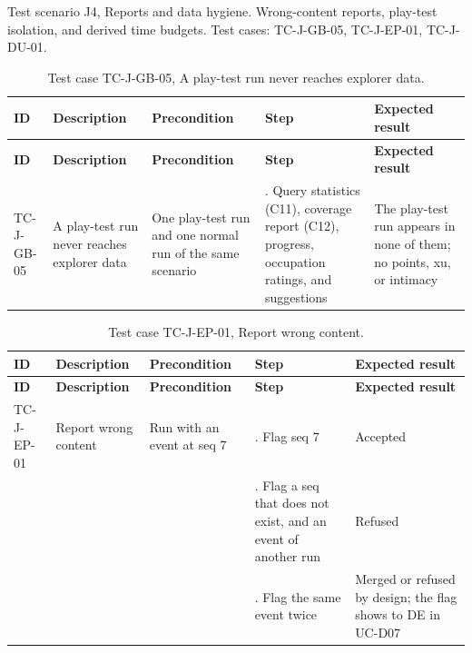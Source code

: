 Test scenario J4, Reports and data hygiene. Wrong-content reports, play-test isolation, and derived time budgets. Test cases: TC-J-GB-05, TC-J-EP-01, TC-J-DU-01.

{\small
\begin{longtable}{|>{\raggedright\arraybackslash}p{}|>{\raggedright\arraybackslash}p{}|>{\raggedright\arraybackslash}p{}|>{\raggedright\arraybackslash}p{}|>{\raggedright\arraybackslash}p{}|}
\caption{Test case TC-J-GB-05, A play-test run never reaches explorer data.} \\
\hline
\textbf{ID} & \textbf{Description} & \textbf{Precondition} & \textbf{Step} & \textbf{Expected result} \\ \hline
\endfirsthead
\hline
\textbf{ID} & \textbf{Description} & \textbf{Precondition} & \textbf{Step} & \textbf{Expected result} \\ \hline
\endhead
TC-J-GB-05 & A play-test run never reaches explorer data & One play-test run and one normal run of the same scenario & 1. Query statistics (C11), coverage report (C12), progress, occupation ratings, and suggestions & The play-test run appears in none of them; no points, xu, or intimacy \\ \hline
\end{longtable}
}

{\small
\begin{longtable}{|>{\raggedright\arraybackslash}p{}|>{\raggedright\arraybackslash}p{}|>{\raggedright\arraybackslash}p{}|>{\raggedright\arraybackslash}p{}|>{\raggedright\arraybackslash}p{}|}
\caption{Test case TC-J-EP-01, Report wrong content.} \\
\hline
\textbf{ID} & \textbf{Description} & \textbf{Precondition} & \textbf{Step} & \textbf{Expected result} \\ \hline
\endfirsthead
\hline
\textbf{ID} & \textbf{Description} & \textbf{Precondition} & \textbf{Step} & \textbf{Expected result} \\ \hline
\endhead
TC-J-EP-01 & Report wrong content & Run with an event at seq 7 & 1. Flag seq 7 & Accepted \\ \hline
 &  &  & 2. Flag a seq that does not exist, and an event of another run & Refused \\ \hline
 &  &  & 3. Flag the same event twice & Merged or refused by design; the flag shows to DE in UC-D07 \\ \hline
\end{longtable}
}

